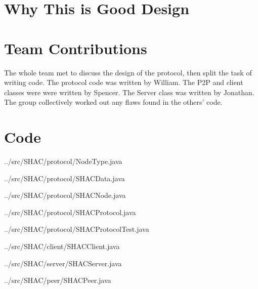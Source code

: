 \documentclass[11pt]{article}
\begin{document}
\begin{doublespace}
\section{Why This is Good Design}



\section{Team Contributions}

The whole team met to discuss the design of the protocol, then split the task of writing code.
The protocol code was written by William.
The P2P and client classes were were written by Spencer.
The Server class was written by Jonathan.
The group collectively worked out any flaws found in the others' code.

\section{Code}
\end{doublespace}
\begin{tiny}

\begin{lstinputlisting}[language=Java]{../src/SHAC/protocol/NodeType.java}
\end{lstinputlisting}
\begin{lstinputlisting}[language=Java]{../src/SHAC/protocol/SHACData.java}
\end{lstinputlisting}
\begin{lstinputlisting}[language=Java]{../src/SHAC/protocol/SHACNode.java}
\end{lstinputlisting}
\begin{lstinputlisting}[language=Java]{../src/SHAC/protocol/SHACProtocol.java}
\end{lstinputlisting}
\begin{lstinputlisting}[language=Java]{../src/SHAC/protocol/SHACProtocolTest.java}
\end{lstinputlisting}
\begin{lstinputlisting}[language=Java]{../src/SHAC/client/SHACClient.java}
\end{lstinputlisting}
\begin{lstinputlisting}[language=Java]{../src/SHAC/server/SHACServer.java}
\end{lstinputlisting}
\begin{lstinputlisting}[language=Java]{../src/SHAC/peer/SHACPeer.java}
\end{lstinputlisting}

\end{tiny}
\end{document}
